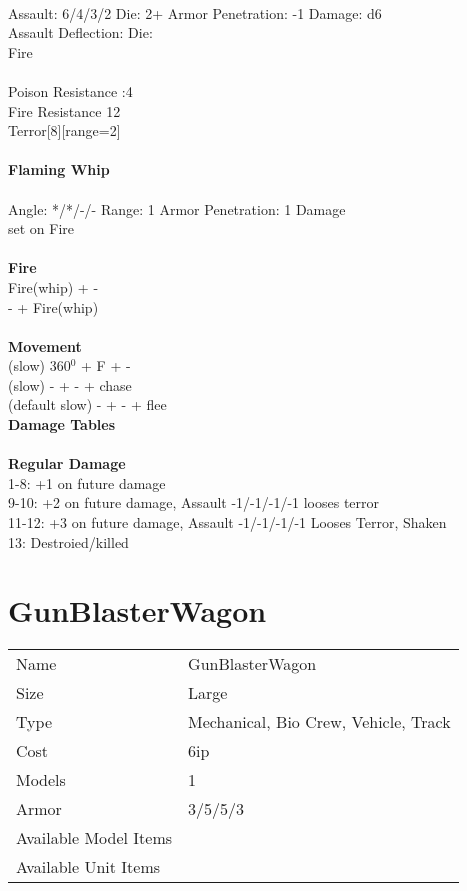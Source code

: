 \ \\
Assault: 6/4/3/2 Die: 2+ Armor Penetration: -1 Damage: d6 \\
Assault Deflection:  Die: \\
\indent Fire \\
\ \\
Poison Resistance :4 \\ Fire Resistance 12 \\ Terror[8][range=2]
\ \\
\ \\
{\bf Flaming Whip } \\
\ \\
Angle: */*/-/- Range: 1 Armor Penetration: 1 Damage  \\
\indent set on Fire \\





\ \\ {\bf Fire } \\
Fire(whip) + - \\
- + Fire(whip) \\
\ \\ {\bf Movement } \\
(slow) 360$^0$ + F + - \\
(slow) - + - + chase \\
(default slow) - + - + flee \\



{\bf Damage Tables} \\
\ \\ {\bf Regular Damage } \\
1-8: +1 on future damage \\
9-10: +2 on future damage, Assault -1/-1/-1/-1 looses terror \\
11-12: +3 on future damage, Assault -1/-1/-1/-1 Looses Terror, Shaken \\
13: Destroied/killed \\









\pagebreak

\section{ GunBlasterWagon }

\begin{tabular}{ll}
  Name & GunBlasterWagon \\
  Size & Large\\
  Type & Mechanical, Bio Crew, Vehicle, Track\\
  Cost & 6ip\\
  Models & 1\\
  Armor & 3/5/5/3\\
  Available Model Items &  \\
  Available Unit Items &  \\
\end{tabular}

